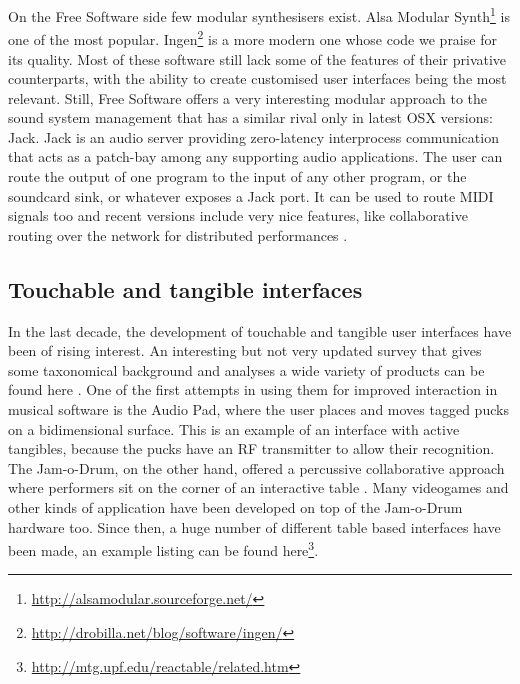 On the Free Software side few modular synthesisers exist. Alsa Modular
Synth\footnote{\url{http://alsamodular.sourceforge.net/}} is one of
the most
popular. Ingen\footnote{\url{http://drobilla.net/blog/software/ingen/}}
is a more modern one whose code we praise for its quality. Most of
these software still lack some of the features of their privative
counterparts, with the ability to create customised user interfaces
being the most relevant. Still, Free Software offers a very
interesting modular approach to the sound system management that has a
similar rival only in latest OSX versions:
Jack\cite{letz09jack2}. Jack is an audio server providing zero-latency
interprocess communication that acts as a patch-bay among any
supporting audio applications. The user can route the output of one
program to the input of any other program, or the soundcard sink, or
whatever exposes a Jack port. It can be used to route MIDI signals too
and recent versions include very nice features, like collaborative
routing over the network for distributed performances \cite{hohn09netjack}.

\subsection{Touchable and tangible interfaces}

In the last decade, the development of touchable and tangible user
interfaces have been of rising interest. An interesting but not very
updated survey that gives some taxonomical background and analyses a
wide variety of products can be found here
\cite{blaine2003contexts}. One of the first attempts in using them for
improved interaction in musical software is the Audio
Pad\cite{patten2002audiopad}, where the user places and moves tagged
pucks on a bidimensional surface. This is an example of an interface
with active tangibles, because the pucks have an RF transmitter to
allow their recognition. The Jam-o-Drum, on the other hand, offered a
percussive collaborative approach where performers sit on the corner
of an interactive table \cite{blaine00jam}. Many videogames and other
kinds of application have been developed on top of the Jam-o-Drum
hardware too. Since then, a huge number of different table based
interfaces have been made, an example listing can be found
here\footnote{\url{http://mtg.upf.edu/reactable/related.htm}}.

